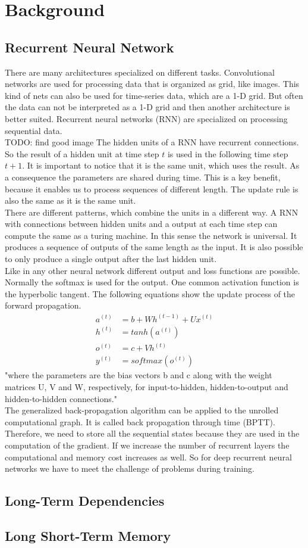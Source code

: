 \section{Background}
\label{sec:background}

\subsection{Recurrent Neural Network}
\label{sec:rnn}
There are many architectures specialized on different tasks. Convolutional networks are used for processing data that is organized as grid, like images. This kind of nets can also be used for time-series data, which are a 1-D grid. But often the data can not be interpreted as a 1-D grid and then another architecture is better suited. Recurrent neural networks (RNN) are specialized on processing sequential data.\\
TODO: find good image
The hidden units of a RNN have recurrent connections. So the result of a hidden unit at time step $t$ is used in the following time step $t+1$. It is important to notice that it is the same unit, which uses the result. As a consequence the parameters are shared during time. This is a key benefit, because it enables us to process sequences of different length. The update rule is also the same as it is the same unit.\\
There are different patterns, which combine the units in a different way. A RNN with connections between hidden units and a output at each time step can compute the same as a turing machine. In this sense the network is universal. It produces a sequence of outputs of the same length as the input. It is also possible to only produce a single output after the last hidden unit.\\
Like in any other neural network different output and loss functions are possible. Normally the softmax is used for the output. One common activation function is the hyperbolic tangent. The following equations show the update process of the forward propagation.
\begin{align}
a^{(t)} &= b + Wh^{(t-1)} + Ux^{(t)} \\
h^{(t)} &= tanh(a^{(t)}) \\
o^{(t)} &= c + Vh^{(t)} \\
y^{(t)} &= softmax(o^{(t)})
\end{align}
"where the parameters are the bias vectors b and c along with the weight matrices U, V and W, respectively, for input-to-hidden, hidden-to-output and hidden-to-hidden connections."\cite[p.371]{DeepLearning}\\
The generalized back-propagation algorithm can be applied to the unrolled computational graph. It is called back propagation through time (BPTT). Therefore, we need to store all the sequential states because they are used in the computation of the gradient. If we increase the number of recurrent layers the computational and memory cost increases as well. So for deep recurrent neural networks we have to meet the challenge of problems during training.

\subsection{Long-Term Dependencies}
\label{sec:ltd}

\subsection{Long Short-Term Memory}
\label{sec:lstm}